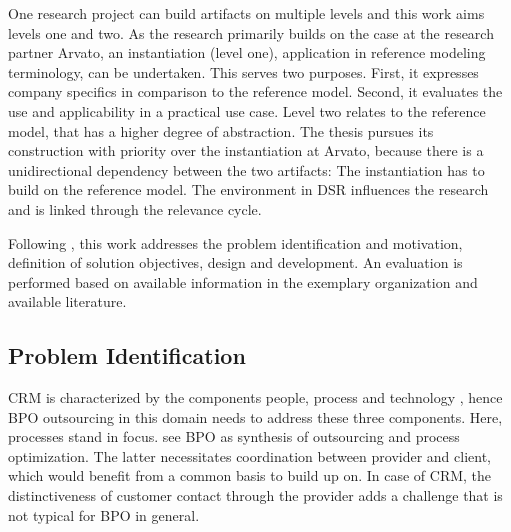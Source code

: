 One research project can build artifacts on multiple levels \citep{gregor2013positioning} and this work aims levels one and two. As the research primarily builds on the case at the research partner Arvato, an instantiation (level one), \viz application in reference modeling terminology, can be undertaken. This serves two purposes. First, it expresses company specifics in comparison to the reference model. Second, it evaluates the use and applicability in a practical use case.  Level two relates to the reference model, that has a higher degree of abstraction. The thesis pursues its construction with priority over the instantiation at Arvato, because there is a unidirectional dependency between the two artifacts: The instantiation has to build on the reference model. The environment in \acrshort{DSR} influences the research and is linked through the relevance cycle. 

Following \citeauthor{Hevner2004,Peffers2007}, this work addresses the problem identification and motivation, definition of solution objectives,  design and development. An evaluation is performed based on available information in the exemplary organization and available literature. 



\subsection{Problem Identification}
\label{sec:proide}
CRM is characterized by the components people, process and technology \citep{Chen_2003}, hence BPO outsourcing in this domain needs to address these three components. Here, processes stand in focus.  \cite{schewe2007} see BPO as synthesis of outsourcing and process optimization. The latter necessitates coordination between provider and client, which would benefit from a common basis to build up on. In case of CRM, the distinctiveness of customer contact through the provider adds a challenge that is not typical for BPO in general. 

